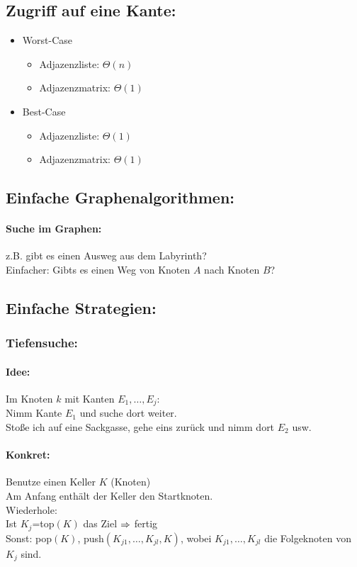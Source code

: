 \documentclass[a4paper,twoside,DIV15,BCOR12mm]{scrbook}
\begin{document}
\subsection{Zugriff auf eine Kante: }
\begin{itemize}
	\item Worst-Case
	\begin{itemize}
		\item Adjazenzliste: $\Theta(n)$
		\item Adjazenzmatrix: $\Theta(1)$
	\end{itemize}
	\item Best-Case
	\begin{itemize}
		\item Adjazenzliste: $\Theta(1)$
		\item Adjazenzmatrix: $\Theta(1)$
	\end{itemize}
\end{itemize}

\subsection{Einfache Graphenalgorithmen: }
\paragraph{Suche im Graphen: } z.B. gibt es einen Ausweg aus dem Labyrinth?\\
Einfacher: Gibts es einen Weg von Knoten $A$ nach Knoten $B$?
\subsection{Einfache Strategien: }
\subsubsection{Tiefensuche: }
\paragraph{Idee: } Im Knoten $k$ mit Kanten $E_1,\ldots,E_j$:\\
Nimm Kante $E_1$ und suche dort weiter.\\
Stoße ich auf eine Sackgasse, gehe eins zurück und nimm dort $E_2$ usw.
\paragraph{Konkret: } Benutze einen Keller $K$ (Knoten)\\
Am Anfang enthält der Keller den Startknoten.\\
Wiederhole:\\
Ist $K_j$=top$(K)$ das Ziel $\Rightarrow$ fertig\\
Sonst: pop$(K)$, push$(K_{j1},\ldots,K_{jl},K)$, wobei $K_{j1},\ldots,K_{jl}$ die Folgeknoten von $K_j$ sind.
\end{document}
